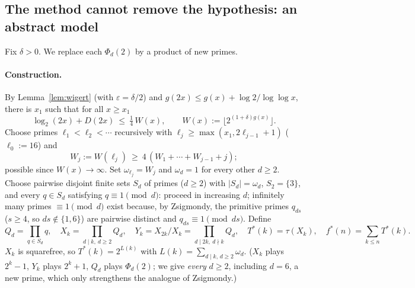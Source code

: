 \documentclass[11pt]{article}
\theoremstyle{remark}
\begin{document}
\subsection{The method cannot remove the hypothesis: an abstract model}

Fix $\delta>0$. We replace each $\Phi_d(2)$ by a product of new primes.

\paragraph{Construction.} By Lemma~\ref{lem:wigert} (with $\varepsilon=\delta/2$) and
$g(2x)\le g(x)+\log2/\log\log x$, there is $x_1$ such that for all $x\ge x_1$
\begin{equation}\label{eq:x1}
  \log_2(2x)+D(2x)\ \le\ \tfrac14\,W(x),\qquad W(x):=\big\lfloor2^{(1+\delta)g(x)}\big\rfloor .
\end{equation}
Choose primes $\ell_1<\ell_2<\cdots$ recursively with $\ell_j\ge\max(x_1,2\ell_{j-1}+1)$ ($\ell_0:=16$) and
\begin{equation}\label{eq:sparse}
  W_j:=W(\ell_j)\ \ge\ 4\,(W_1+\cdots+W_{j-1}+j);
\end{equation}
possible since $W(x)\to\infty$. Set $\omega_{\ell_j}=W_j$ and $\omega_d=1$ for every other $d\ge2$.
Choose pairwise disjoint finite sets $S_d$ of primes ($d\ge2$) with $|S_d|=\omega_d$, $S_2=\{3\}$,
and every $q\in S_d$ satisfying $q\equiv1\pmod d$: proceed in increasing $d$; infinitely many
primes $\equiv1\pmod d$ exist because, by Zsigmondy, the primitive primes $q_{ds}$ ($s\ge4$,
so $ds\notin\{1,6\}$) are pairwise distinct and $q_{ds}\equiv1\pmod{ds}$. Define
\[
  Q_d=\prod_{q\in S_d}q,\quad X_k=\prod_{d\mid k,\ d\ge2}Q_d,\quad
  Y_k=X_{2k}/X_k=\prod_{d\mid2k,\ d\nmid k}Q_d,\quad T^*(k)=\tau(X_k),\quad f^*(n)=\sum_{k\le n}T^*(k).
\]
$X_k$ is squarefree, so $T^*(k)=2^{L(k)}$ with $L(k)=\sum_{d\mid k,\,d\ge2}\omega_d$.
($X_k$ plays $2^k-1$, $Y_k$ plays $2^k+1$, $Q_d$ plays $\Phi_d(2)$; we give \emph{every} $d\ge2$,
including $d=6$, a new prime, which only strengthens the analogue of Zsigmondy.)
\end{document}
